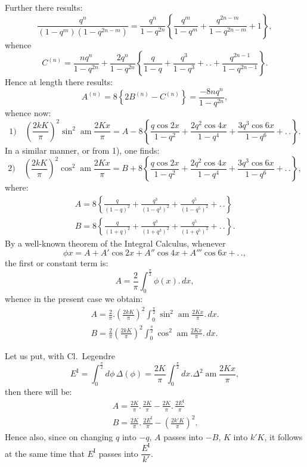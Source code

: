 \documentclass{article}
\begin{document}
Further there results:
\[
\frac{q^{n}}{(1-q^{m})(1-q^{2n-m})}=\frac{q^{n}}{1-q^{2n}}\left\{\frac{q^{m}}{1-q^{m}}+\frac{q^{2n-m}}{1-q^{2n-m}}+1\right\},
\]
whence
\[
C^{(n)}=\frac{nq^{n}}{1-q^{2n}}+\frac{2q^{n}}{1-q^{2n}}\left\{\frac{q}{1-q}+\frac{q^{3}}{1-q^{3}}+.\,.+\frac{q^{2n-1}}{1-q^{2n-1}}\right\}.
\]
Hence at length there results:
\[
A^{(n)}=8\left\{2B^{(n)}-C^{(n)}\right\}=\frac{-8nq^{n}}{1-q^{2n}},
\]
whence now:
\[
\text{1)}\quad\left(\frac{2kK}{\pi}\right)^{2}\sin^{2}\operatorname{am}\frac{2Kx}{\pi}=A-8\left\{\frac{q\cos 2x}{1-q^{2}}+\frac{2q^{2}\cos 4x}{1-q^{4}}+\frac{3q^{3}\cos 6x}{1-q^{6}}+.\,.\right\}.
\]
In a similar manner, or from 1), one finds:
\[
\text{2)}\quad\left(\frac{2kK}{\pi}\right)^{2}\cos^{2}\operatorname{am}\frac{2Kx}{\pi}=B+8\left\{\frac{q\cos 2x}{1-q^{2}}+\frac{2q^{2}\cos 4x}{1-q^{4}}+\frac{3q^{3}\cos 6x}{1-q^{6}}+.\,.\right\},
\]
where:
\[
\begin{gathered}
A=8\left\{\frac{q}{(1-q)^{2}}+\frac{q^{3}}{(1-q^{3})^{2}}+\frac{q^{5}}{(1-q^{5})^{2}}+.\,.\right\}\\[1.5ex]
B=8\left\{\frac{q}{(1+q)^{2}}+\frac{q^{3}}{(1+q^{3})^{2}}+\frac{q^{5}}{(1+q^{5})^{2}}+.\,.\right\}.
\end{gathered}
\]
By a well-known theorem of the Integral Calculus, whenever
\[
\phi x=A+A'\cos 2x+A''\cos 4x+A'''\cos 6x+.\,.,
\]
the first or constant term is:
\[
A=\frac{2}{\pi}\int_{0}^{\frac{\pi}{2}}\phi(x).\,dx,
\]
whence in the present case we obtain:
\[
\begin{gathered}
A=\frac{2}{\pi}.\left(\frac{2kK}{\pi}\right)^{2}\int_{0}^{\frac{\pi}{2}}\sin^{2}\operatorname{am}\frac{2Kx}{\pi}.\,dx.\\[1.5ex]
B=\frac{2}{\pi}\left(\frac{2kK}{\pi}\right)^{2}\int_{0}^{\frac{\pi}{2}}\cos^{2}\operatorname{am}\frac{2Kx}{\pi}.\,dx.
\end{gathered}
\]

Let us put, with Cl.\ Legendre
\[
E^{\mathrm{I}}=\int_{0}^{\frac{\pi}{2}}d\phi\,\Delta(\phi)=\frac{2K}{\pi}\int_{0}^{\frac{\pi}{2}}dx.\Delta^{2}\operatorname{am}\frac{2Kx}{\pi},
\]
then there will be:
\[
\begin{gathered}
A=\frac{2K}{\pi}.\,\frac{2K}{\pi}-\frac{2K}{\pi}.\,\frac{2E^{\mathrm{I}}}{\pi}\\[1.5ex]
B=\frac{2K}{\pi}.\,\frac{2E^{\mathrm{I}}}{\pi}-\left(\frac{2k'K}{\pi}\right)^{2}.
\end{gathered}
\]
Hence also, since on changing $q$ into $-q$, $A$ passes into $-B$, $K$ into $k'K$, it follows at the same time that $E^{\mathrm{I}}$ passes into $\dfrac{E^{\mathrm{I}}}{k'}$.
\end{document}
